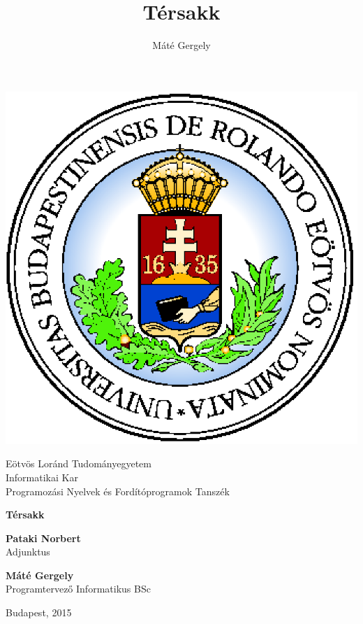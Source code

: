 \documentclass[12pt, twoside]{report}
\title{Térsakk}
\author{Máté Gergely}
\begin{document}
\begin{titlepage}
	\thispagestyle{empty}
	
	\begin{minipage}{0.30\linewidth}
		\includegraphics[scale=0.4]{eltecimer.eps}
	\end{minipage}
	\begin{minipage}{0.50\linewidth}
		\begin{center}
			Eötvös Loránd Tudományegyetem \\
			Informatikai Kar\\
			Programozási Nyelvek és Fordítóprogramok Tanszék
		\end{center}
	\end{minipage}
	
	
	\vspace{7cm}
	
	\begin{center}
		\Huge
		\textbf{Térsakk}
		\normalsize
	\end{center}
	
	\vspace{5.4cm}
	
	
	\begin{minipage}{0.5\linewidth}
		\textbf{Pataki Norbert}\\
		Adjunktus
	\end{minipage}
	\begin{minipage}{0.5\linewidth}
		\textbf{Máté Gergely}\\
		Programtervező Informatikus BSc
	\end{minipage}
	
	\vspace{4cm}
	
	\begin{center}
		Budapest, 2015
	\end{center}
	
\end{titlepage}
\end{document}
